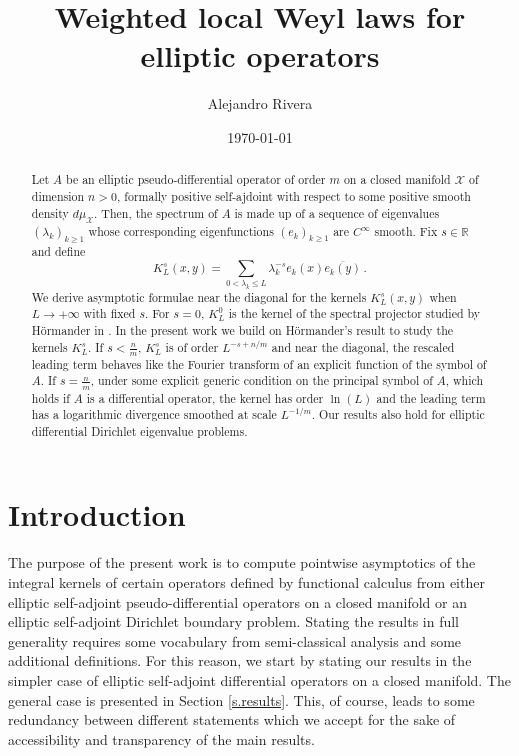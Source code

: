 \documentclass[10pt,twoside]{article}
\title{Weighted local Weyl laws for elliptic operators}
\author{Alejandro Rivera}
\date{\today}
\newcommand{\R}{\mathbb{R}}
\newcommand{\man}{\mathcal{X}}
\numberwithin{theorem}{section}
\begin{document}
\maketitle

\vspace{2cm}

\begin{abstract}
Let $A$ be an elliptic pseudo-differential operator of order $m$ on a closed manifold $\man$ of dimension $n>0$, formally positive self-ajdoint with respect to some positive smooth density $d\mu_\man$. Then, the spectrum of $A$ is made up of a sequence of eigenvalues $(\lambda_k)_{k\geq 1}$ whose corresponding eigenfunctions $(e_k)_{k\geq 1}$ are $C^\infty$ smooth. Fix $s\in\R$ and define \
\[
K_L^s(x,y)=\sum_{0<\lambda_k\leq L}\lambda_k^{-s} e_k(x)\overline{e_k(y)}\, .
\]
We derive asymptotic formulae near the diagonal for the kernels $K_L^s(x,y)$ when $L\rightarrow +\infty$ with fixed $s$. For $s=0$, $K^0_L$ is the kernel of the spectral projector studied by H\"ormander in \cite{ho68}. In the present work we build on H\"ormander's result to study the kernels $K^s_L$. If $s<\frac{n}{m}$, $K_L^s$ is of order $L^{-s+n/m}$ and near the diagonal, the rescaled leading term behaves like the Fourier transform of an explicit function of the symbol of $A$. If $s=\frac{n}{m}$, under some explicit generic condition on the principal symbol of $A$, which holds if $A$ is a differential operator, the kernel has order $\ln(L)$ and the leading term has a logarithmic divergence smoothed at scale $L^{-1/m}$. Our results also hold for elliptic differential Dirichlet eigenvalue problems.
\end{abstract}

\vfill

\pagebreak

\tableofcontents

\vfill

\pagebreak

\section{Introduction}

The purpose of the present work is to compute pointwise asymptotics of the integral kernels of certain operators defined by functional calculus from either elliptic self-adjoint pseudo-differential operators on a closed manifold or an elliptic self-adjoint Dirichlet boundary problem. Stating the results in full generality requires some vocabulary from semi-classical analysis and some additional definitions. For this reason, we start by stating our results in the simpler case of elliptic self-adjoint differential operators on a closed manifold. The general case is presented in Section \ref{s.results}. This, of course, leads to some redundancy between different statements which we accept for the sake of accessibility and transparency of the main results.\\ 
\end{document}
